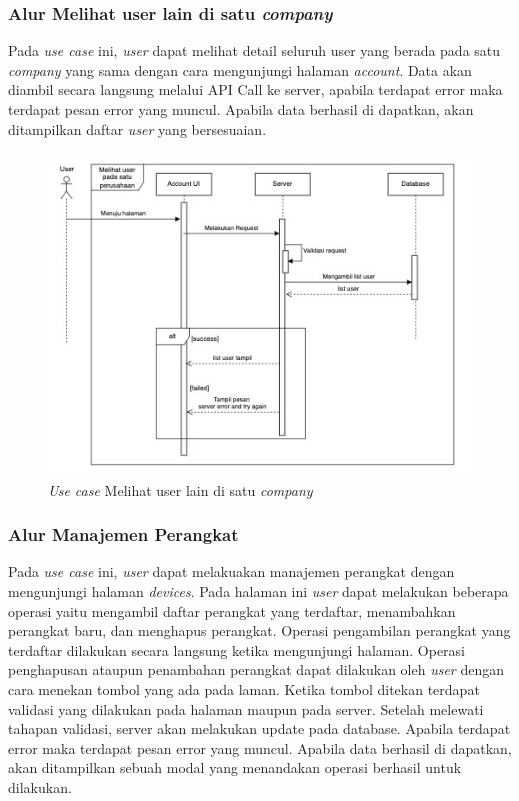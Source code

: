 \pagebreak

\subsubsection{Alur Melihat user lain di satu \textit{company}}

Pada \textit{use case} ini, \textit{user} dapat melihat detail seluruh user yang berada pada satu \textit{company} yang sama dengan cara mengunjungi halaman \textit{account}. Data akan diambil secara langsung melalui API Call ke server, apabila terdapat error maka terdapat pesan error yang muncul. Apabila data berhasil di dapatkan, akan ditampilkan daftar \textit{user} yang bersesuaian.

\begin{figure}[h]
  \centering
  \includegraphics[width=1\textwidth]{resources/chapter-3/usecase/uc-07.jpg}
  \caption{\textit{Use case} Melihat user lain di satu \textit{company}}
  \label{fig:usecase-07}
\end{figure}

\pagebreak

\subsubsection{Alur Manajemen Perangkat}

Pada \textit{use case} ini, \textit{user} dapat melakuakan manajemen perangkat dengan mengunjungi halaman \textit{devices}. Pada halaman ini \textit{user} dapat melakukan beberapa operasi yaitu mengambil daftar perangkat yang terdaftar, menambahkan perangkat baru, dan menghapus perangkat. Operasi pengambilan perangkat yang terdaftar dilakukan secara langsung ketika mengunjungi halaman. Operasi penghapusan ataupun penambahan perangkat dapat dilakukan oleh \textit{user} dengan cara menekan tombol yang ada pada laman. Ketika tombol ditekan terdapat validasi yang dilakukan pada halaman maupun pada server. Setelah melewati tahapan validasi, server akan melakukan update pada database. Apabila terdapat error maka terdapat pesan error yang muncul. Apabila data berhasil di dapatkan, akan ditampilkan sebuah modal yang menandakan operasi berhasil untuk dilakukan.

